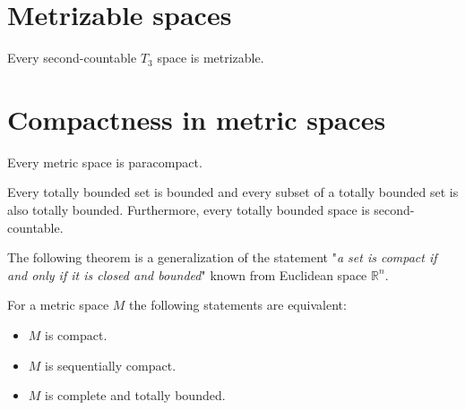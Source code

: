 \section{Metrizable spaces}    
	
	\begin{theorem}
		Every second-countable $T_3$ space is metrizable.
	\end{theorem}

\section{Compactness in metric spaces}

	\begin{theorem}[Stone]
		Every metric space is paracompact.
	\end{theorem}

	\begin{property}
		Every totally bounded set is bounded and every subset of a totally bounded set is also totally bounded. Furthermore, every totally bounded space is second-countable.
	\end{property}
	
	The following theorem is a generalization of the statement "\textit{a set is compact if and only if it is closed and bounded}" known from Euclidean space $\mathbb{R}^n$.
	\begin{theorem}
		For a metric space $M$ the following statements are equivalent:
		\begin{itemize}
			\item $M$ is compact.
			\item $M$ is sequentially compact.
			\item $M$ is complete and totally bounded.
		\end{itemize}
	\end{theorem}	
	
